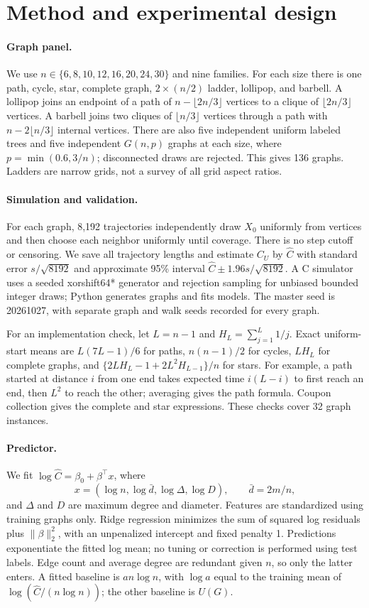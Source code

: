 \documentclass{article}
\begin{document}
\section{Method and experimental design}
\paragraph{Graph panel.}
We use $n\in\{6,8,10,12,16,20,24,30\}$ and nine families. For each size there is one path, cycle, star, complete graph, $2\times(n/2)$ ladder, lollipop, and barbell. A lollipop joins an endpoint of a path of $n-\lfloor2n/3\rfloor$ vertices to a clique of $\lfloor2n/3\rfloor$ vertices. A barbell joins two cliques of $\lfloor n/3\rfloor$ vertices through a path with $n-2\lfloor n/3\rfloor$ internal vertices. There are also five independent uniform labeled trees and five independent $G(n,p)$ graphs at each size, where $p=\min(0.6,3/n)$; disconnected draws are rejected. This gives 136 graphs. Ladders are narrow grids, not a survey of all grid aspect ratios.

\paragraph{Simulation and validation.}
For each graph, 8,192 trajectories independently draw $X_0$ uniformly from vertices and then choose each neighbor uniformly until coverage. There is no step cutoff or censoring. We save all trajectory lengths and estimate $C_U$ by $\widehat C$ with standard error $s/\sqrt{8192}$ and approximate 95\% interval $\widehat C\pm1.96s/\sqrt{8192}$. A C simulator uses a seeded xorshift64* generator and rejection sampling for unbiased bounded integer draws; Python generates graphs and fits models. The master seed is 20261027, with separate graph and walk seeds recorded for every graph.

For an implementation check, let $L=n-1$ and $H_L=\sum_{j=1}^{L}1/j$. Exact uniform-start means are $L(7L-1)/6$ for paths, $n(n-1)/2$ for cycles, $LH_L$ for complete graphs, and $\{2LH_L-1+2L^2H_{L-1}\}/n$ for stars. For example, a path started at distance $i$ from one end takes expected time $i(L-i)$ to first reach an end, then $L^2$ to reach the other; averaging gives the path formula. Coupon collection gives the complete and star expressions. These checks cover 32 graph instances.

\paragraph{Predictor.}
We fit $\log\widehat C=\beta_0+\beta^\top x$, where
\[
 x=(\log n,\log\bar d,\log\Delta,\log D),\qquad \bar d=2m/n,
\]
and $\Delta$ and $D$ are maximum degree and diameter. Features are standardized using training graphs only. Ridge regression minimizes the sum of squared log residuals plus $\|\beta\|_2^2$, with an unpenalized intercept and fixed penalty 1. Predictions exponentiate the fitted log mean; no tuning or correction is performed using test labels. Edge count and average degree are redundant given $n$, so only the latter enters. A fitted baseline is $a n\log n$, with $\log a$ equal to the training mean of $\log(\widehat C/(n\log n))$; the other baseline is $U(G)$.
\end{document}
